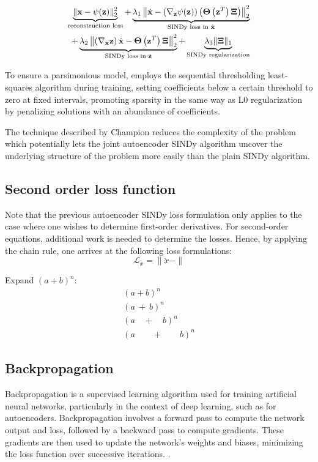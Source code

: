 \begin{align}
    \underbrace{\|\mathbf{x}-\psi(\mathbf{z})\|_2^2}_{\text{reconstruction loss}}
    + \underbrace{\lambda_1\left\|\dot{\mathbf{x}}-\left(\nabla_{\mathbf{z}} \psi(\mathbf{z})\right)\left(\boldsymbol{\Theta}\left(\mathbf{z}^T\right) \boldsymbol{\Xi}\right)\right\|_2^2}_{\text{SINDy loss in } \dot{\mathbf{x}}} \notag 
    \\
    + \underbrace{\lambda_2\left\|\left(\nabla_{\mathbf{x}} \mathbf{z}\right) \dot{\mathbf{x}}-\boldsymbol{\Theta}\left(\mathbf{z}^T\right) \boldsymbol{\Xi}\right\|_2^2}_{\text{SINDy loss in } \dot{\mathbf{z}}}
    + \underbrace{\lambda_3\|\boldsymbol{\Xi}\|_1}_{\text{SINDy regularization}}
\end{align}



To ensure a parsimonious model, \textcite{Champion_2019} employs the sequential thresholding least-squares algorithm during training, setting coefficients below a certain threshold to zero at fixed intervals, promoting sparsity in the same way as L0 regularization by penalizing solutions with an abundance of coefficients. 

The technique described by Champion reduces the complexity of the problem which potentially lets the joint autoencoder SINDy algorithm uncover the underlying structure of the problem more easily than the plain SINDy algorithm.
\subsection{Second order loss function}
Note that the previous autoencoder SINDy loss formulation only applies to the case where one wishes to determine first-order derivatives. 
For second-order equations, additional work is needed to determine the losses. 
Hence, by applying the chain rule, one arrives at the following loss formulations:
\begin{equation*}
    \mathcal L_{\ddot{x}} = \|\ddot{x} - \|
\end{equation*}
 
Expand $(a+b)^n$:
\begin{gather*}
  (a + b)^n\\
  (a\ + \ b)^n\\
  (a\quad + \quad b)^n\\
  (a\qquad + \qquad b)^n
\end{gather*}

\subsection{Backpropagation}
Backpropagation is a supervised learning algorithm used for training artificial neural networks, particularly in the context of deep learning, such as for autoencoders. Backpropagation involves a forward pass to compute the network output and loss, followed by a backward pass to compute gradients. These gradients are then used to update the network's weights and biases, minimizing the loss function over successive iterations. \cite{backprop}. 

